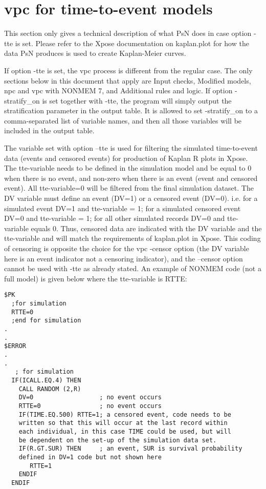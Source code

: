 \section {vpc for time-to-event models}
This section only gives a technical description of what PsN does in case option -tte is set. Please refer to the Xpose documentation on kaplan.plot for how the data PsN produces is used to create Kaplan-Meier curves.

If option -tte is set, the vpc process is different from the regular case. The only sections below in this document that apply are Input checks, Modified models, npc and vpc with NONMEM 7, and Additional rules and logic. If option -stratify\_on is set together with -tte, the program will simply output the stratification parameter in the output table. It is allowed to set -stratify\_on to a comma-separated list of variable names, and then all those variables will be included in the output table.  

The variable set with option –tte is used for filtering the simulated time-to-event data (events and censored events) for production of Kaplan R plots in Xpose. The tte-variable needs to be defined in the simulation model and be equal to 0 when there is no event, and non-zero when there is an event (event and censored event). All tte-variable=0 will be filtered from the final simulation dataset. The DV variable must define an event (DV=1) or a censored event (DV=0).  i.e. for a simulated event DV=1 and tte-variable = 1; for a simulated censored event DV=0 and tte-variable = 1; for all other simulated records DV=0 and tte-variable equals 0. Thus, censored data are indicated with the DV variable and the tte-variable and will match the requirements of kaplan.plot in Xpose. This coding of censoring is opposite the choice for the vpc -censor option (the DV variable here is an event indicator not a censoring indicator), and the –censor option cannot be used with -tte as already stated. An example of NONMEM code (not a full model) is given below where the tte-variable is RTTE:

\begin{verbatim}
$PK
  ;for simulation
  RTTE=0
  ;end for simulation
.
.
$ERROR
.
.
   ; for simulation 
  IF(ICALL.EQ.4) THEN
    CALL RANDOM (2,R)
    DV=0                  ;	no event occurs
    RTTE=0                ;	no event occurs 
    IF(TIME.EQ.500) RTTE=1; a censored event, code needs to be
    written so that this will occur at the last record within 
    each individual, in this case TIME could be used, but will 
    be dependent on the set-up of the simulation data set.
    IF(R.GT.SUR) THEN     ; an event, SUR is survival probability 
    defined in DV=1	code but not shown here
       RTTE=1
    ENDIF
  ENDIF
\end{verbatim}


